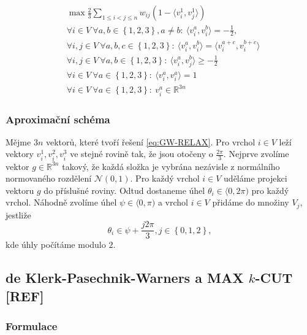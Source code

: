 \begin{equation}\tag{GW-RELAX}
    \begin{split}
        &\max \frac{2}{3} \sum_{1 \leq i < j \leq n} w_{ij} (1 - \langle v_i^1, v_j^1 \rangle) \\
        &\forall i \in V\ \forall a,b \in \left\{ 1,2,3 \right\}, a \neq b:\ \langle v_i^a, v_i^b \rangle = -\frac{1}{2}, \\
        &\forall i,j \in V\ \forall a,b,c \in \left\{ 1,2,3 \right\}:\ \langle v_i^a, v_i^b \rangle = \langle v_i^{a+c}, v_i^{b+c} \rangle \\
        &\forall i,j \in V\ \forall a,b \in \left\{ 1,2,3 \right\}:\ \langle v_i^a, v_j^b \rangle \geq -\frac{1}{2} \\
        &\forall i \in V\ \forall a \in \left\{ 1,2,3 \right\}:\ \langle v_i^a, v_i^a \rangle = 1 \\
        &\forall i \in V\ \forall a \in \left\{ 1,2,3 \right\}:\ v_i^a \in \mathbb{R}^{3n}
    \end{split}
    \label{eq:GW-RELAX}
\end{equation}

\subsubsection*{Aproximační schéma}

Mějme $3n$ vektorů, které tvoří řešení \ref{eq:GW-RELAX}. Pro vrchol $i \in V$ leží vektory $v_i^1, v_i^2, v_i^3$ ve stejné rovině tak, že jsou otočeny o $\frac{2\pi}{3}$. Nejprve zvolíme vektor $g \in \mathbb{R}^{3n}$ takový, že každá složka je vybrána nezávisle z normálního normovaného rozdělení $\mathcal{N}(0,1)$. Pro každý vrchol $i \in V$ uděláme projekci vektoru $g$ do příslušné roviny. Odtud dostaneme úhel $\theta_i \in \langle 0, 2\pi)$ pro každý vrchol. Náhodně zvolíme úhel $\psi \in \langle 0, \pi)$ a vrchol $i \in V$ přidáme do množiny $V_j$, jestliže
$$
    \theta_i \in \psi + \frac{j 2 \pi}{3}, j \in \left\{ 0, 1, 2 \right\},
$$
kde úhly počítáme modulo $2$.

\subsection{de Klerk-Pasechnik-Warners a MAX $k$-CUT \textbf{[REF]}}

\subsubsection*{Formulace}

